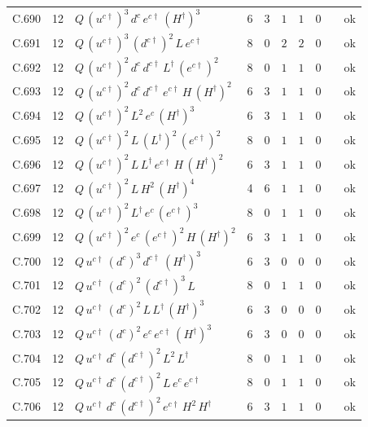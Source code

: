 {\begin{longtable}{@{}ll>{\raggedright\arraybackslash}p{6.4cm}rrllllr@{}}
C.690 & 12 & $Q\,(u^{c\dagger})^{3}\,d^c\,e^{c\dagger}\,(H^\dagger)^{3}$ & 6 & 3 & $1$ & $1$ & $0$ &  & ok \\
C.691 & 12 & $Q\,(u^{c\dagger})^{3}\,(d^{c\dagger})^{2}\,L\,e^{c\dagger}$ & 8 & 0 & $2$ & $2$ & $0$ &  & ok \\
C.692 & 12 & $Q\,(u^{c\dagger})^{2}\,d^c\,d^{c\dagger}\,L^\dagger\,(e^{c\dagger})^{2}$ & 8 & 0 & $1$ & $1$ & $0$ &  & ok \\
C.693 & 12 & $Q\,(u^{c\dagger})^{2}\,d^c\,d^{c\dagger}\,e^{c\dagger}\,H\,(H^\dagger)^{2}$ & 6 & 3 & $1$ & $1$ & $0$ &  & ok \\
C.694 & 12 & $Q\,(u^{c\dagger})^{2}\,L^{2}\,e^c\,(H^\dagger)^{3}$ & 6 & 3 & $1$ & $1$ & $0$ &  & ok \\
C.695 & 12 & $Q\,(u^{c\dagger})^{2}\,L\,(L^\dagger)^{2}\,(e^{c\dagger})^{2}$ & 8 & 0 & $1$ & $1$ & $0$ &  & ok \\
C.696 & 12 & $Q\,(u^{c\dagger})^{2}\,L\,L^\dagger\,e^{c\dagger}\,H\,(H^\dagger)^{2}$ & 6 & 3 & $1$ & $1$ & $0$ &  & ok \\
C.697 & 12 & $Q\,(u^{c\dagger})^{2}\,L\,H^{2}\,(H^\dagger)^{4}$ & 4 & 6 & $1$ & $1$ & $0$ &  & ok \\
C.698 & 12 & $Q\,(u^{c\dagger})^{2}\,L^\dagger\,e^c\,(e^{c\dagger})^{3}$ & 8 & 0 & $1$ & $1$ & $0$ &  & ok \\
C.699 & 12 & $Q\,(u^{c\dagger})^{2}\,e^c\,(e^{c\dagger})^{2}\,H\,(H^\dagger)^{2}$ & 6 & 3 & $1$ & $1$ & $0$ &  & ok \\
C.700 & 12 & $Q\,u^{c\dagger}\,(d^c)^{3}\,d^{c\dagger}\,(H^\dagger)^{3}$ & 6 & 3 & $0$ & $0$ & $0$ &  & ok \\
C.701 & 12 & $Q\,u^{c\dagger}\,(d^c)^{2}\,(d^{c\dagger})^{3}\,L$ & 8 & 0 & $1$ & $1$ & $0$ &  & ok \\
C.702 & 12 & $Q\,u^{c\dagger}\,(d^c)^{2}\,L\,L^\dagger\,(H^\dagger)^{3}$ & 6 & 3 & $0$ & $0$ & $0$ &  & ok \\
C.703 & 12 & $Q\,u^{c\dagger}\,(d^c)^{2}\,e^c\,e^{c\dagger}\,(H^\dagger)^{3}$ & 6 & 3 & $0$ & $0$ & $0$ &  & ok \\
C.704 & 12 & $Q\,u^{c\dagger}\,d^c\,(d^{c\dagger})^{2}\,L^{2}\,L^\dagger$ & 8 & 0 & $1$ & $1$ & $0$ &  & ok \\
C.705 & 12 & $Q\,u^{c\dagger}\,d^c\,(d^{c\dagger})^{2}\,L\,e^c\,e^{c\dagger}$ & 8 & 0 & $1$ & $1$ & $0$ &  & ok \\
C.706 & 12 & $Q\,u^{c\dagger}\,d^c\,(d^{c\dagger})^{2}\,e^{c\dagger}\,H^{2}\,H^\dagger$ & 6 & 3 & $1$ & $1$ & $0$ &  & ok \\

\end{longtable}}
